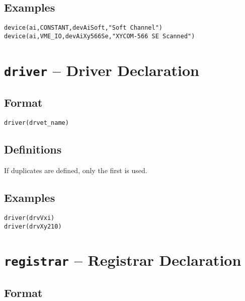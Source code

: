 \subsection{Examples}

\begin{verbatim}
device(ai,CONSTANT,devAiSoft,"Soft Channel")
device(ai,VME_IO,devAiXy566Se,"XYCOM-566 SE Scanned")
\end{verbatim}

\section{\texttt{driver} -- Driver Declaration}

\subsection{Format}

\begin{verbatim}
driver(drvet_name)
\end{verbatim}

\subsection{Definitions}

\begin{description}
\item [drvet\_name] If duplicates are defined, only the first is used.

\end{description}

\subsection{Examples}

\begin{verbatim}
driver(drvVxi)
driver(drvXy210)
\end{verbatim}

\section{\texttt{registrar} -- Registrar Declaration}

\subsection{Format}

